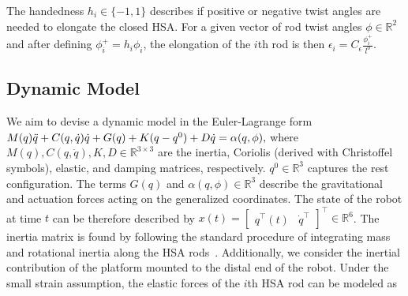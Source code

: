 The handedness $h_i \in \{-1, 1\}$ describes if positive or negative twist angles are needed to elongate the closed \gls{HSA}.
For a given vector of rod twist angles $\phi \in \mathbb{R}^2$ and after defining $\phi_{i}^+ = h_i \phi_i$, the elongation of the $i$th rod is then $\epsilon_i = C_\epsilon \frac{\phi_{i}^+}{l^0}$.


\subsection{Dynamic Model}\label{sub:hsamodel:planar_hsa_robot_model:dynamics}
We aim to devise a dynamic model in the Euler-Lagrange form
$M(q) \Ddot{q} + C(q,\dot{q})\dot{q} + G(q) + K (q - q^0) + D \dot{q} = \alpha(q,\phi),$
where $M(q),C(q,\dot{q}),K,D \in \mathbb{R}^{3 \times 3}$ are the inertia, Coriolis (derived with Christoffel symbols), elastic, and damping matrices, respectively. $q^0 \in \mathbb{R}^3$ captures the rest configuration. The terms $G(q)$ and $\alpha(q,\phi) \in \mathbb{R}^3$ describe the gravitational and actuation forces acting on the generalized coordinates.
The state of the robot at time $t$ can be therefore described by $x(t) = \begin{bmatrix}
    q^\top(t) & \dot{q}^\top
\end{bmatrix}^\top \in \mathbb{R}^6$.
The inertia matrix is found by following the standard procedure of integrating mass and rotational inertia along the \gls{HSA} rods~\citep{della2023model}. Additionally, we consider the inertial contribution of the platform mounted to the distal end of the robot.
Under the small strain assumption, the elastic forces of the $i$th \gls{HSA} rod can be modeled as
